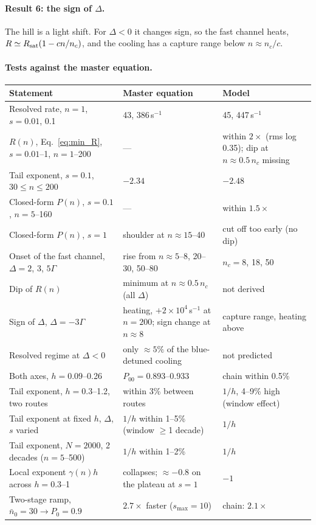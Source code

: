 \documentclass[11pt,a4paper]{article}
\begin{document}
\paragraph{Result 6: the sign of $\Delta$.} The hill is a light shift. For $\Delta<0$ it changes sign, so the fast channel heats, $R\simeq R_{\rm sat}(1-cn/n_c)$, and the cooling has a capture range below $n\approx n_c/c$.

\paragraph{Tests against the master equation.}

\begin{center}\small
\begin{tabular}{p{}p{}p{}}
\toprule
Statement & Master equation & Model \\
\midrule
Resolved rate, $n=1$, $s=0.01$, 0.1 & 43, 386\,s$^{-1}$ & 45, 447\,s$^{-1}$ \\
$R(n)$, Eq.~\eqref{eq:min_R}, $s=0.01$--1, $n=1$--200 & --- & within $2\times$ (rms log 0.35); dip at $n\approx0.5\,n_c$ missing \\
Tail exponent, $s=0.1$, $30\le n\le200$ & $-2.34$ & $-2.48$ \\
Closed-form $P(n)$, $s=0.1$, $n=5$--160 & --- & within $1.5\times$ \\
Closed-form $P(n)$, $s=1$ & shoulder at $n\approx15$--40 & cut off too early (no dip) \\
Onset of the fast channel, $\Delta=2$, 3, $5\Gamma$ & rise from $n\approx5$--8, 20--30, 50--80 & $n_c=8$, 18, 50 \\
Dip of $R(n)$ & minimum at $n\approx0.5\,n_c$ (all $\Delta$) & not derived \\
Sign of $\Delta$, $\Delta=-3\Gamma$ & heating, $+2\times10^4\,$s$^{-1}$ at $n=200$; sign change at $n\approx8$ & capture range, heating above \\
Resolved regime at $\Delta<0$ & only $\approx5\%$ of the blue-detuned cooling & not predicted \\
Both axes, $h=0.09$--0.26 & $P_{00}=0.893$--0.933 & chain within 0.5\% \\
Tail exponent, $h=0.3$--1.2, two routes & within 3\% between routes & $1/h$, 4--9\% high (window effect) \\
Tail exponent at fixed $h$, $\Delta$, $s$ varied & $1/h$ within 1--5\% (window $\ge$1 decade) & $1/h$ \\
Tail exponent, $N=2000$, 2 decades ($n=5$--500) & $1/h$ within 1--2\% & $1/h$ \\
Local exponent $\gamma(n)h$ across $h=0.3$--1 & collapses; $\approx-0.8$ on the plateau at $s=1$ & $-1$ \\
Two-stage ramp, $\bar n_0=30\to P_0=0.9$ & $2.7\times$ faster ($s_{\max}=10$) & chain: $2.1\times$ \\
\bottomrule
\end{tabular}
\end{center}
\end{document}
